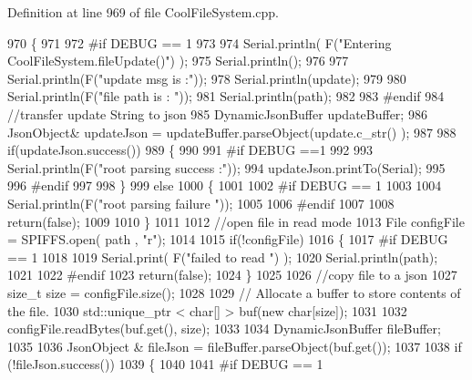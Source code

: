 Definition at line 969 of file Cool\+File\+System.\+cpp.


\begin{DoxyCode}
970 \{
971 
972 \textcolor{preprocessor}{#if DEBUG == 1}
973 
974     Serial.println( F(\textcolor{stringliteral}{"Entering CoolFileSystem.fileUpdate()"}) );
975     Serial.println();
976     
977     Serial.println(F(\textcolor{stringliteral}{"update msg is :"}));
978     Serial.println(update);
979     
980     Serial.println(F(\textcolor{stringliteral}{"file path is : "}));
981     Serial.println(path);   
982 
983 \textcolor{preprocessor}{#endif}
984     \textcolor{comment}{//transfer update String to json}
985     DynamicJsonBuffer updateBuffer;
986     JsonObject& updateJson = updateBuffer.parseObject(update.c\_str() );
987     
988     \textcolor{keywordflow}{if}(updateJson.success())
989     \{
990     
991 \textcolor{preprocessor}{    #if DEBUG ==1}
992         
993         Serial.println(F(\textcolor{stringliteral}{"root parsing success :"}));
994         updateJson.printTo(Serial);
995     
996 \textcolor{preprocessor}{    #endif}
997 
998     \}
999     \textcolor{keywordflow}{else}
1000     \{
1001     
1002 \textcolor{preprocessor}{    #if DEBUG == 1 }
1003     
1004         Serial.println(F(\textcolor{stringliteral}{"root parsing failure "}));
1005     
1006 \textcolor{preprocessor}{    #endif}
1007         
1008         \textcolor{keywordflow}{return}(\textcolor{keyword}{false});  
1009 
1010     \}
1011     
1012     \textcolor{comment}{//open file in read mode}
1013     File configFile = SPIFFS.open( path , \textcolor{stringliteral}{"r"});
1014     
1015     \textcolor{keywordflow}{if}(!configFile)
1016     \{   
1017 \textcolor{preprocessor}{    #if DEBUG == 1}
1018         
1019         Serial.print( F(\textcolor{stringliteral}{"failed to read "}) );
1020         Serial.println(path);
1021 
1022 \textcolor{preprocessor}{    #endif}
1023         \textcolor{keywordflow}{return}(\textcolor{keyword}{false});
1024     \}
1025 
1026     \textcolor{comment}{//copy file to a json}
1027     \textcolor{keywordtype}{size\_t} size = configFile.size();
1028 
1029     \textcolor{comment}{// Allocate a buffer to store contents of the file.}
1030     std::unique\_ptr < char[] > buf(\textcolor{keyword}{new} \textcolor{keywordtype}{char}[size]);
1031 
1032     configFile.readBytes(buf.get(), size);
1033 
1034     DynamicJsonBuffer fileBuffer;
1035 
1036     JsonObject & fileJson = fileBuffer.parseObject(buf.get());
1037 
1038     \textcolor{keywordflow}{if} (!fileJson.success())
1039     \{
1040 
1041 \textcolor{preprocessor}{    #if DEBUG == 1}

\end{DoxyCode}
